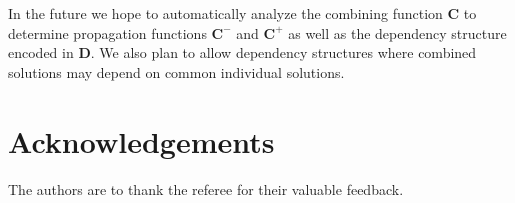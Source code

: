 \documentclass[graybox]{svmult}
\begin{document}
In the future we hope to automatically analyze the combining function $\boldsymbol{C}$ to determine propagation functions $\boldsymbol{C}^-$ and $\boldsymbol{C}^+$ as well as the dependency structure encoded in $\boldsymbol{D}$. We also plan to allow dependency structures where combined solutions may depend on common individual solutions.

\section*{Acknowledgements}

The authors are to thank the referee for their valuable feedback.

%
%
%
\end{document}
